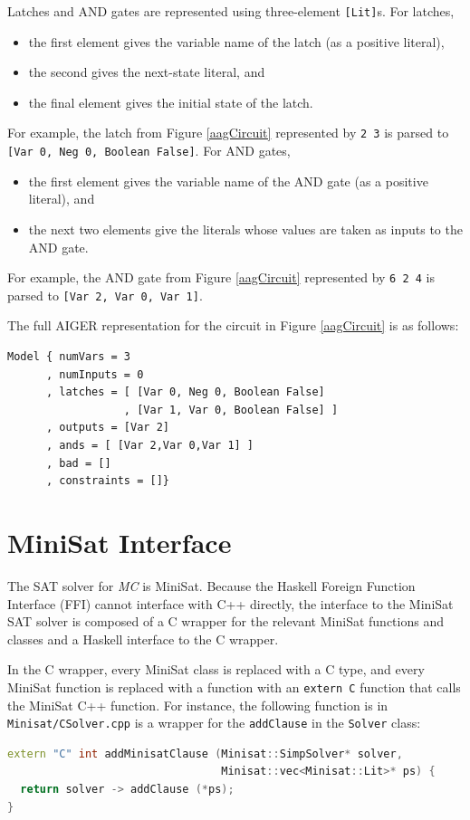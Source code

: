 \documentclass[12pt,a4paper,twoside,openright]{report}
\begin{document}
{Latches and AND gates are represented using three-element \verb,[Lit],s. For latches,
\begin{itemize}
\item the first element gives the variable name of the latch (as a positive literal),
\item the second gives the next-state literal, and
\item the final element gives the initial state
of the latch.
\end{itemize}
For example, the latch from Figure \ref{aagCircuit} represented by \verb,2 3, is parsed
to \verb.[Var 0, Neg 0, Boolean False]..
For AND gates,
\begin{itemize}
\item the first element gives the variable name of the AND gate
(as a positive literal), and
\item the next two elements give the literals whose values are taken
as inputs to the AND gate.
\end{itemize}
For example, the AND gate from Figure \ref{aagCircuit} represented by \verb,6 2 4, is
parsed to \verb.[Var 2, Var 0, Var 1]..

The full AIGER representation for the circuit in Figure \ref{aagCircuit} is
as follows:
\begin{verbatim}
Model { numVars = 3
      , numInputs = 0
      , latches = [ [Var 0, Neg 0, Boolean False]
                  , [Var 1, Var 0, Boolean False] ]
      , outputs = [Var 2]
      , ands = [ [Var 2,Var 0,Var 1] ]
      , bad = []
      , constraints = []}
\end{verbatim}

\section{MiniSat Interface}
\label{impl:minisat}

The SAT solver for \emph{MC} is MiniSat.
Because the Haskell Foreign Function Interface (FFI) cannot interface with C++ directly,
the interface to the MiniSat SAT solver is composed of a C wrapper for the relevant
MiniSat functions and classes and a Haskell interface to the C wrapper.

In the C wrapper,
every MiniSat class is replaced with a C
type, and every MiniSat function is replaced with a function with an \verb,extern C, function that
calls the MiniSat C++ function. For instance, the following function is
in \verb,Minisat/CSolver.cpp, is a wrapper for the \verb,addClause, in the \verb,Solver,
class:
\begin{lstlisting}[language = C++]
extern "C" int addMinisatClause (Minisat::SimpSolver* solver,
                                 Minisat::vec<Minisat::Lit>* ps) {
  return solver -> addClause (*ps);
}
\end{lstlisting}

}
\end{document}
